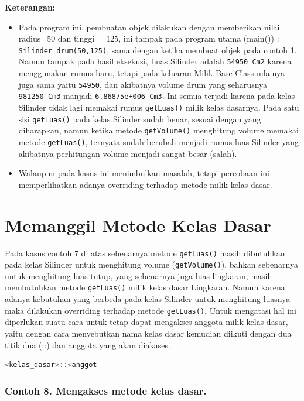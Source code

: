 \textbf{Keterangan:}

\begin{itemize}
\tightlist
\item
  Pada program ini, pembuatan objek dilakukan dengan memberikan nilai
  radius=50 dan tinggi = 125, ini tampak pada program utama (main()) :
  \texttt{Silinder\ drum(50,125)}, sama dengan ketika membuat objek pada
  contoh 1. Namun tampak pada hasil eksekusi, Luas Silinder adalah
  \texttt{54950\ Cm2} karena menggunakan rumus baru, tetapi pada
  keluaran Milik Base Class nilainya juga sama yaitu \texttt{54950}, dan
  akibatnya volume drum yang seharusnya \texttt{981250\ Cm3} manjadi
  \texttt{6.86875e+006\ Cm3}. Ini semua terjadi karena pada kelas
  Silinder tidak lagi memakai rumus \texttt{getLuas()} milik kelas
  dasarnya. Pada satu sisi \texttt{getLuas()} pada kelas Silinder sudah
  benar, sesuai dengan yang diharapkan, namun ketika metode
  \texttt{getVolume()} menghitung volume memakai metode
  \texttt{getLuas()}, ternyata sudah berubah menjadi rumus luas Silinder
  yang akibatnya perhitungan volume menjadi sangat besar (salah).
\item
  Walaupun pada kasus ini menimbulkan masalah, tetapi percobaan ini
  memperlihatkan adanya overriding terhadap metode milik kelas dasar.
\end{itemize}

\section{Memanggil Metode Kelas
Dasar}\label{memanggil-metode-kelas-dasar}

Pada kasus contoh 7 di atas sebenarnya metode \texttt{getLuas()} masih
dibutuhkan pada kelas Silinder untuk menghitung volume
(\texttt{getVolume()}), bahkan sebenarnya untuk menghitung luas tutup,
yang sebenarnya juga luas lingkaran, masih membutuhkan metode
\texttt{getLuas()} milik kelas dasar Lingkaran. Namun karena adanya
kebutuhan yang berbeda pada kelas Silinder untuk menghitung luasnya maka
dilakukan overriding terhadap metode \texttt{getLuas()}. Untuk mengatasi
hal ini diperlukan suatu cara untuk tetap dapat mengakses anggota milik
kelas dasar, yaitu dengan cara menyebutkan nama kelas dasar kemudian
diikuti dengan dua titik dua (::) dan anggota yang akan diakases.

\begin{lstlisting}[language=c++]
<kelas_dasar>::<anggot
\end{lstlisting}

\subsubsection*{Contoh 8. Mengakses metode kelas dasar.}

